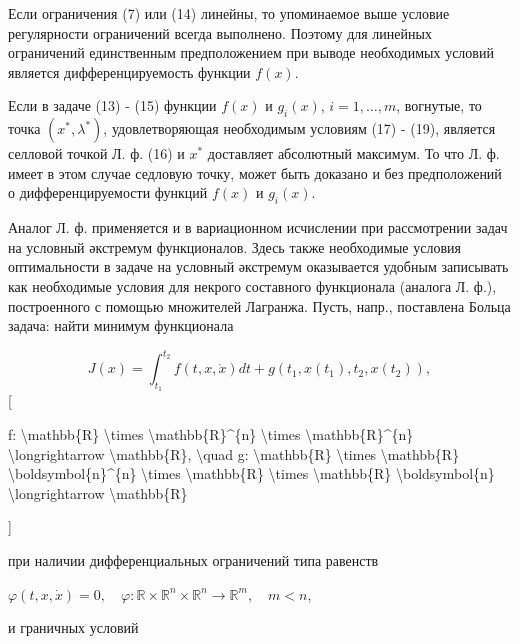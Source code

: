 \documentclass[10pt]{article}
\begin{document}
Если ограничения (7) или (14) линейны, то упоминаемое выше условие регулярности ограничений всегда выполнено. Поэтому для линейных ограничений единственным предположением при выводе необходимых условий является дифференцируемость функции $f(x)$.



Если в задаче (13) - (15) функции $f(x)$ и $g_{i}(x)$, $i=1, \ldots, m$, вогнутые, то точка $\left(x^{*}, \lambda^{*}\right)$, удовлетворяющая необходимым условиям (17) - (19), является селловой точкой Л. ф. (16) и $x^{*}$ доставляет абсолютный максимум. То что Л. ф. имеет в этом случае седловую точку, может быть доказано и без предположений о дифференцируемости функций $f(x)$ и $g_{i}(x)$.



Аналог Л. ф. применяется и в вариационном исчислении при рассмотрении задач на условный әкстремум функционалов. Здесь также необходимые условия оптимальности в задаче на условный әкстремум оказывается удобным записывать как необходимые условия для некрого составного функционала (аналога Л. ф.), построенного с помощью множителей Лагранжа. Пусть, напр., поставлена Больца задача: найти минимум функционала



\[

J(x)=\int_{t_{1}}^{t_{2}} f(t, x, \dot{x}) d t+g\left(t_{1}, x\left(t_{1}\right), t_{2}, x\left(t_{2}\right)\right),

\][



f: \textbackslash mathbb\{R\} \textbackslash times \textbackslash mathbb\{R\}\^{}\{n\} \textbackslash times \textbackslash mathbb\{R\}\^{}\{n\} \textbackslash longrightarrow \textbackslash mathbb\{R\}, \textbackslash quad g: \textbackslash mathbb\{R\} \textbackslash times \textbackslash mathbb\{R\} \textbackslash boldsymbol\{n\}\^{}\{n\} \textbackslash times \textbackslash mathbb\{R\} \textbackslash times \textbackslash mathbb\{R\} \textbackslash boldsymbol\{n\} \textbackslash longrightarrow \textbackslash mathbb\{R\}

]



при наличии дифференциальных ограничений типа равенств



$\varphi(t, x, \dot{x})=0, \quad \varphi: \mathbb{R} \times \mathbb{R}^{n} \times \mathbb{R}^{n} \longrightarrow \mathbb{R}^{m}, \quad m<n$,



и граничных условий
\end{document}
